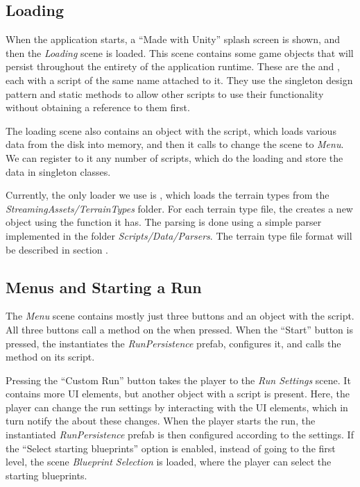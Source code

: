\subsection{Loading}

When the application starts, a \enquote{Made with Unity} splash screen is shown, and then the \emph{Loading} scene is loaded.
This scene contains some game objects that will persist throughout the entirety of the application runtime.
These are the  and , each with a script of the same name attached to it.
They use the singleton design pattern and static methods to allow other scripts to use their functionality without obtaining a reference to them first.

The loading scene also contains an object with the  script, which loads various data from the disk into memory, and then it calls to change the scene to \emph{Menu}.
We can register to it any number of  scripts, which do the loading and store the data in singleton classes.

Currently, the only loader we use is , which loads the terrain types from the \emph{StreamingAssets/TerrainTypes} folder.
For each terrain type file, the  creates a new  object using the function  it has.
The parsing is done using a simple parser implemented in the folder \emph{Scripts/Data/Parsers}.
The terrain type file format will be described in section .

\subsection{Menus and Starting a Run}

The \emph{Menu} scene contains mostly just three buttons and an object with the  script.
All three buttons call a method on the  when pressed.
When the \enquote{Start} button is pressed, the  instantiates the \emph{RunPersistence} prefab, configures it, and calls the  method on its  script.

Pressing the \enquote{Custom Run} button takes the player to the \emph{Run Settings} scene.
It contains more UI elements, but another object with a  script is present.
Here, the player can change the run settings by interacting with the UI elements, which in turn notify the  about these changes.
When the player starts the run, the instantiated \emph{RunPersistence} prefab is then configured according to the settings.
If the \enquote{Select starting blueprints} option is enabled, instead of going to the first level, the scene \emph{Blueprint Selection} is loaded, where the player can select the starting blueprints.

